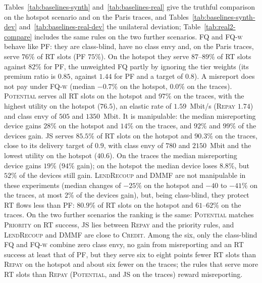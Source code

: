 \documentclass[preprint,11pt]{elsarticle}
\theoremstyle{definition}
\theoremstyle{remark}
\newcommand{\repay}{\textsc{Repay}}
\begin{document}
Tables~\ref{tab:baselines-synth} and~\ref{tab:baselines-real} give the truthful comparison on the hotspot scenario and on the Paris traces, and Tables~\ref{tab:baselines-synth-dev} and~\ref{tab:baselines-real-dev} the unilateral deviation; Table~\ref{tab:real2-compare} includes the same rules on the two further scenarios.
\textsc{FQ} and \textsc{FQ-w} behave like \textsc{PF}: they are class-blind, have no class envy and, on the Paris traces, serve $76\%$ of RT slots (\textsc{PF} $75\%$). On the hotspot they serve $87$--$89\%$ of RT slots against $82\%$ for \textsc{PF}, the unweighted \textsc{FQ} partly by ignoring the tier weights (its premium ratio is $0.85$, against $1.44$ for \textsc{PF} and a target of $0.8$). A misreport does not pay under \textsc{FQ-w} (median $-0.7\%$ on the hotspot, $0.0\%$ on the traces).
\textsc{Potential} serves all RT slots on the hotspot and $97\%$ on the traces, with the highest utility on the hotspot ($76.5$), an elastic rate of $1.59$~Mbit/s (\repay{} $1.74$) and class envy of $505$ and $1350$~Mbit. It is manipulable: the median misreporting device gains $28\%$ on the hotspot and $14\%$ on the traces, and $92\%$ and $99\%$ of the devices gain.
\textsc{JS} serves $85.5\%$ of RT slots on the hotspot and $90.3\%$ on the traces, close to its delivery target of $0.9$, with class envy of $780$ and $2150$~Mbit and the lowest utility on the hotspot ($40.6$). On the traces the median misreporting device gains $19\%$ ($94\%$ gain); on the hotspot the median device loses $8.8\%$, but $52\%$ of the devices still gain.
\textsc{LendRecoup} and \textsc{DMMF} are not manipulable in these experiments (median changes of $-25\%$ on the hotspot and $-40$ to $-41\%$ on the traces, at most $2\%$ of the devices gain), but, being class-blind, they protect RT flows less than \textsc{PF}: $80.9\%$ of RT slots on the hotspot and $61$--$62\%$ on the traces.
On the two further scenarios the ranking is the same: \textsc{Potential} matches \textsc{Priority} on RT success, \textsc{JS} lies between \repay{} and the priority rules, and \textsc{LendRecoup} and \textsc{DMMF} are close to \textsc{Credit}.
Among the six, only the class-blind \textsc{FQ} and \textsc{FQ-w} combine zero class envy, no gain from misreporting and an RT success at least that of \textsc{PF}, but they serve six to eight points fewer RT slots than \repay{} on the hotspot and about six fewer on the traces; the rules that serve more RT slots than \repay{} (\textsc{Potential}, and \textsc{JS} on the traces) reward misreporting.
\end{document}
